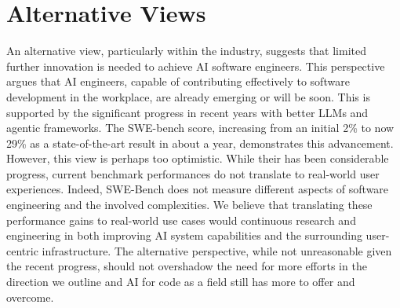 \section{Alternative Views}

An alternative view, particularly within the industry, suggests that limited further innovation is needed to achieve AI software engineers. 
This perspective argues that AI engineers, capable of contributing effectively to software development in the workplace, are already emerging or will be soon.  This is supported by the significant progress in recent years with better LLMs and agentic frameworks. 
The SWE-bench score, increasing from an initial 2\% to now 29\% as a state-of-the-art result in about a year, demonstrates this advancement. However, this view is perhaps too optimistic.  
While their has been considerable progress, current benchmark performances do not translate to real-world user experiences.
Indeed, SWE-Bench does not measure different aspects of software engineering and the involved complexities.
We believe that translating these performance gains to real-world use cases would continuous research and engineering in both improving AI system capabilities and the surrounding user-centric infrastructure.
The alternative perspective, while not unreasonable given the recent progress, should not overshadow the need for more efforts in the direction we outline and AI for code as a field still has more to offer and overcome.


